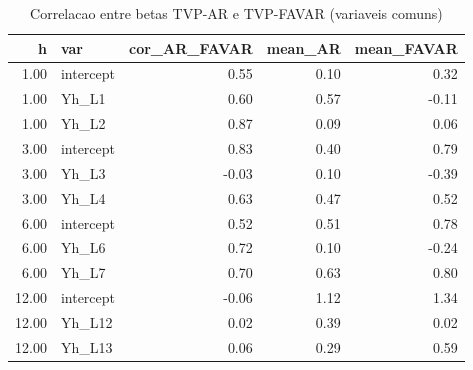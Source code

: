 \begin{table}[ht]
\centering
\begin{tabular}{rlrrr}
  \hline
h & var & cor\_AR\_FAVAR & mean\_AR & mean\_FAVAR \\ 
  \hline
1.00 & intercept & 0.55 & 0.10 & 0.32 \\ 
  1.00 & Yh\_L1 & 0.60 & 0.57 & -0.11 \\ 
  1.00 & Yh\_L2 & 0.87 & 0.09 & 0.06 \\ 
  3.00 & intercept & 0.83 & 0.40 & 0.79 \\ 
  3.00 & Yh\_L3 & -0.03 & 0.10 & -0.39 \\ 
  3.00 & Yh\_L4 & 0.63 & 0.47 & 0.52 \\ 
  6.00 & intercept & 0.52 & 0.51 & 0.78 \\ 
  6.00 & Yh\_L6 & 0.72 & 0.10 & -0.24 \\ 
  6.00 & Yh\_L7 & 0.70 & 0.63 & 0.80 \\ 
  12.00 & intercept & -0.06 & 1.12 & 1.34 \\ 
  12.00 & Yh\_L12 & 0.02 & 0.39 & 0.02 \\ 
  12.00 & Yh\_L13 & 0.06 & 0.29 & 0.59 \\ 
   \hline
\end{tabular}
\caption{Correlacao entre betas TVP-AR e TVP-FAVAR (variaveis comuns)} 
\label{tab:cross_ar_favar}
\end{table}
